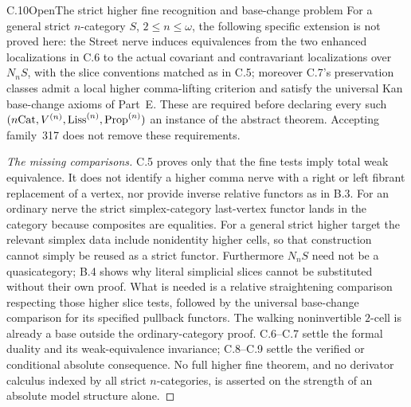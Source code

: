 \begin{claim}{C.10}{Open}{The strict higher fine recognition and base-change problem}
For a general strict $n$-category $S$, $2\leq n\leq\omega$, the following
specific extension is not proved here: the Street nerve induces equivalences
from the two enhanced localizations in C.6 to the actual covariant and
contravariant localizations over $N_nS$, with the slice conventions
matched as in C.5; moreover C.7's preservation classes admit a local
higher comma-lifting criterion and satisfy the universal Kan base-change
axioms of Part~E. These are required before declaring every such
$(n\mathrm{Cat},V^{(n)},\mathrm{Liss}^{(n)},\mathrm{Prop}^{(n)})$ an instance of the abstract
theorem. Accepting family~317 does not remove these requirements.
\end{claim}
\begin{proof}[The missing comparisons]
C.5 proves only that the fine tests imply total weak equivalence.
It does not identify a higher comma nerve with a right or left fibrant
replacement of a vertex, nor provide inverse relative functors as in B.3.
For an ordinary nerve the strict simplex-category last-vertex functor
lands in the category because composites are equalities. For a general
strict higher target the relevant simplex data include nonidentity higher
cells, so that construction cannot simply be reused as a strict functor.
Furthermore $N_nS$ need not be a quasicategory; B.4 shows why literal
simplicial slices cannot be substituted without their own proof.
What is needed is a relative straightening comparison respecting those
higher slice tests, followed by the universal base-change comparison for
its specified pullback functors. The walking noninvertible $2$-cell is
already a base outside the ordinary-category proof.
C.6--C.7 settle the formal duality and its weak-equivalence invariance;
C.8--C.9 settle the verified or conditional absolute consequence.
No full higher fine theorem, and no derivator calculus indexed by all
strict $n$-categories, is asserted on the strength of an absolute model
structure alone.
\end{proof}
